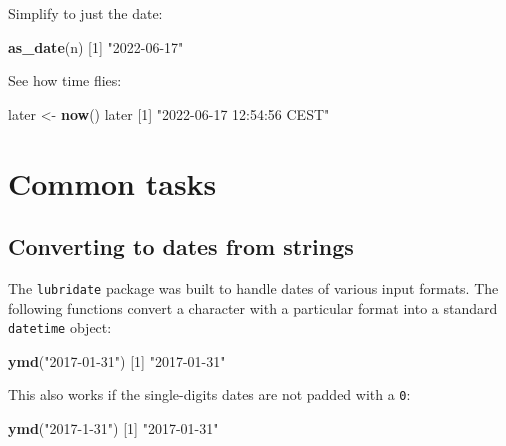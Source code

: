 \documentclass[]{book}
\newenvironment{Shaded}{\begin{snugshade}}{\end{snugshade}}
\newcommand{\DecValTok}[1]{\textcolor[rgb]{0.00,0.00,0.81}{#1}}
\newcommand{\KeywordTok}[1]{\textcolor[rgb]{0.13,0.29,0.53}{\textbf{#1}}}
\newcommand{\NormalTok}[1]{#1}
\newcommand{\StringTok}[1]{\textcolor[rgb]{0.31,0.60,0.02}{#1}}
\begin{document}
Simplify to just the date:

\begin{Shaded}
\begin{Highlighting}[]
\KeywordTok{as_date}\NormalTok{(n)}
\NormalTok{[}\DecValTok{1}\NormalTok{] }\StringTok{"2022-06-17"}
\end{Highlighting}
\end{Shaded}

See how time flies:

\begin{Shaded}
\begin{Highlighting}[]
\NormalTok{later <-}\StringTok{ }\KeywordTok{now}\NormalTok{()}
\NormalTok{later}
\NormalTok{[}\DecValTok{1}\NormalTok{] }\StringTok{"2022-06-17 12:54:56 CEST"}
\end{Highlighting}
\end{Shaded}

\hypertarget{common-tasks}{%
\section*{Common tasks}\label{common-tasks}}

\hypertarget{converting-to-dates-from-strings}{%
\subsection*{Converting to dates from strings}\label{converting-to-dates-from-strings}}

The \texttt{lubridate} package was built to handle dates of various input formats. The following functions convert a character with a particular format into a standard \texttt{datetime} object:

\begin{Shaded}
\begin{Highlighting}[]
\KeywordTok{ymd}\NormalTok{(}\StringTok{"2017-01-31"}\NormalTok{)}
\NormalTok{[}\DecValTok{1}\NormalTok{] }\StringTok{"2017-01-31"}
\end{Highlighting}
\end{Shaded}

This also works if the single-digits dates are not padded with a \texttt{0}:

\begin{Shaded}
\begin{Highlighting}[]
\KeywordTok{ymd}\NormalTok{(}\StringTok{"2017-1-31"}\NormalTok{)}
\NormalTok{[}\DecValTok{1}\NormalTok{] }\StringTok{"2017-01-31"}
\end{Highlighting}
\end{Shaded}
\end{document}
